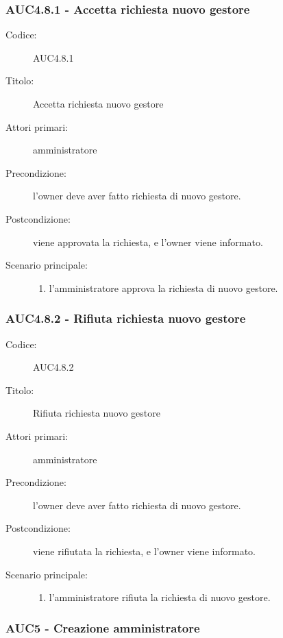 \documentclass[casi-duso]{subfiles}
\begin{document}
\subsubsection{AUC4.8.1 - Accetta richiesta nuovo gestore}%
\label{subsub:AUC4.8.1}
\begin{description}
  \item[Codice:] AUC4.8.1
  \item[Titolo:] Accetta richiesta nuovo gestore
  \item[Attori primari:] amministratore
  \item[Precondizione:] l'owner deve aver fatto richiesta di nuovo gestore.
  \item[Postcondizione:] viene approvata la richiesta, e l'owner viene informato.
  \item[Scenario principale:]
  \begin{enumerate}
    \item l'amministratore approva la richiesta di nuovo gestore.
  \end{enumerate}
\end{description}

\subsubsection{AUC4.8.2 - Rifiuta richiesta nuovo gestore}%
\label{subsub:AUC4.8.2}
\begin{description}
  \item[Codice:] AUC4.8.2
  \item[Titolo:] Rifiuta richiesta nuovo gestore
  \item[Attori primari:] amministratore
  \item[Precondizione:] l'owner deve aver fatto richiesta di nuovo gestore.
  \item[Postcondizione:] viene rifiutata la richiesta, e l'owner viene informato.
  \item[Scenario principale:]
  \begin{enumerate}
    \item l'amministratore rifiuta la richiesta di nuovo gestore.
  \end{enumerate}
\end{description}

\subsubsection{AUC5 - Creazione amministratore}%
\label{subsub:AUC5}
\end{document}
